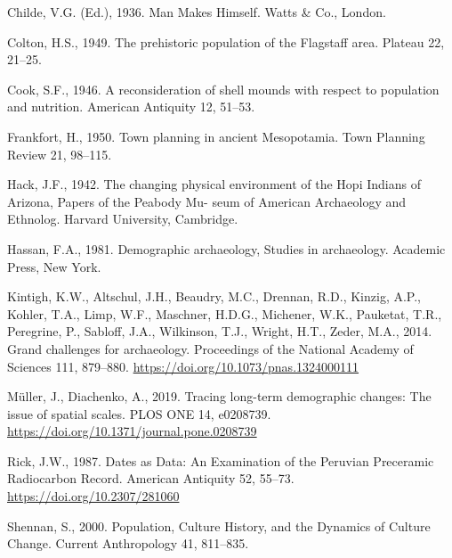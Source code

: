 \documentclass[
]{article}
\newlength{\cslhangindent}
\newlength{\cslentryspacingunit} %
\newenvironment{CSLReferences}[2] %
 {%
  \setlength{\parindent}{0pt}
  \ifodd #1
  \let\oldpar\par
  \def\par{\hangindent=\cslhangindent\oldpar}
  \fi
  \setlength{\parskip}{#2\cslentryspacingunit}
 }%
 {}
\begin{document}
\hypertarget{refs}{}
\begin{CSLReferences}{1}{0}
\leavevmode{}%
Childe, V.G. (Ed.), 1936. Man {Makes} {Himself}. Watts \& Co., London.

\leavevmode{}%
Colton, H.S., 1949. The prehistoric population of the {Flagstaff} area. Plateau 22, 21--25.

\leavevmode{}%
Cook, S.F., 1946. A reconsideration of shell mounds with respect to population and nutrition. American Antiquity 12, 51--53.

\leavevmode{}%
Frankfort, H., 1950. Town planning in ancient {Mesopotamia}. Town Planning Review 21, 98--115.

\leavevmode{}%
Hack, J.F., 1942. The changing physical environment of the {Hopi} {Indians} of {Arizona}, Papers of the {Peabody} {Mu}- seum of {American} {Archaeology} and {Ethnolog}. Harvard University, Cambridge.

\leavevmode{}%
Hassan, F.A., 1981. Demographic archaeology, Studies in archaeology. Academic Press, New York.

\leavevmode{}%
Kintigh, K.W., Altschul, J.H., Beaudry, M.C., Drennan, R.D., Kinzig, A.P., Kohler, T.A., Limp, W.F., Maschner, H.D.G., Michener, W.K., Pauketat, T.R., Peregrine, P., Sabloff, J.A., Wilkinson, T.J., Wright, H.T., Zeder, M.A., 2014. Grand challenges for archaeology. Proceedings of the National Academy of Sciences 111, 879--880. \url{https://doi.org/10.1073/pnas.1324000111}

\leavevmode{}%
Müller, J., Diachenko, A., 2019. Tracing long-term demographic changes: {The} issue of spatial scales. PLOS ONE 14, e0208739. \url{https://doi.org/10.1371/journal.pone.0208739}

\leavevmode{}%
Rick, J.W., 1987. Dates as {Data}: {An} {Examination} of the {Peruvian} {Preceramic} {Radiocarbon} {Record}. American Antiquity 52, 55--73. \url{https://doi.org/10.2307/281060}

\leavevmode{}%
Shennan, S., 2000. Population, {Culture} {History}, and the {Dynamics} of {Culture} {Change}. Current Anthropology 41, 811--835.

\end{CSLReferences}
\end{document}
